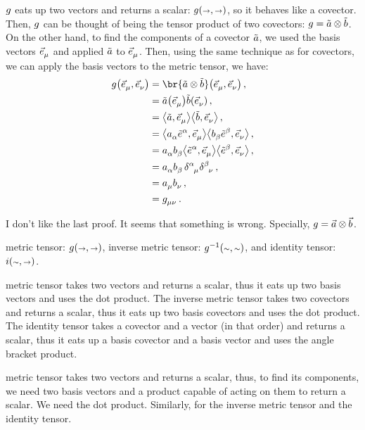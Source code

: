  $g$ eats up two vectors and returns a scalar: $\metric\vat{\vslot,\vslot}$, so it behaves like a covector. Then, $g$ can be thought of being the tensor product of two covectors: $g = \tilde{a}\otimes\tilde{b}$. On the other hand, to find the components of a covector $\tilde{a}$, we used the basis vectors $\tbvec\mu$ and applied $\tilde{a}$ to $\tbvec\mu$. Then, using the same technique as for covectors, we can apply the basis vectors to the metric tensor, we have:
%
\begin{align*}
  \metric\vat{\tbvec\mu,\tbvec\nu} &= \br{\cov a\tprod\cov b}\vat{\tbvec\mu,\tbvec\nu}  \,,\\
                                   &= \cov a\vat{\tbvec\mu}\cov b\vat{\tbvec\nu}        \,, \\
                                   &= \sprod{\cov a}{\tbvec\mu}\sprod{\cov b}{\tbvec\nu} \,, \\
                                   &= \sprod{\tcov a\alpha\tbcov\alpha}{\tbvec\mu}\sprod{\tcov b\beta\tbcov\beta}{\tbvec\nu} \,, \\
                                   &= \tcov a\alpha\tcov b\beta\sprod{\tbcov\alpha}{\tbvec\mu}\sprod{\tbcov\beta}{\tbvec\nu} \,, \\
                                   &= \tcov a\alpha\tcov b\beta\,\tkron\alpha\mu\tkron\beta\nu \,, \\
                                   &= \tcov a\mu\tcov b\nu  \,,\\
                                   &= \tmetric\mu\nu        \,.
\end{align*}

 I don't like the last proof. It seems that something is wrong. Specially, $g = \vec a\otimes\vec b$.

 metric tensor: $\metric\vat{\vslot,\vslot}$, inverse metric tensor: $\invmet\vat{\cslot,\cslot}$, and identity tensor: $\idtens\vat{\cslot,\vslot}$.

 metric tensor takes two vectors and returns a scalar, thus it eats up two basis vectors and uses the dot product. The inverse metric tensor takes two covectors and returns a scalar, thus it eats up two basis covectors and uses the dot product. The identity tensor takes a covector and a vector (in that order) and returns a scalar, thus it eats up a basis covector and a basis vector and uses the angle bracket product.

 metric tensor takes two vectors and returns a scalar, thus, to find its components, we need two basis vectors and a product capable of acting on them to return a scalar. We need the dot product. Similarly, for the inverse metric tensor and the identity tensor.

